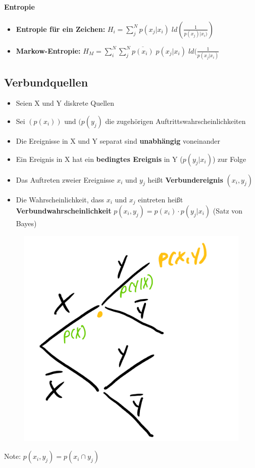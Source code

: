 \documentclass[12pt,a4paper]{article}
\begin{document}
\paragraph{Entropie\\}
\begin{itemize}
\item \textbf{Entropie für ein Zeichen:} $H_i = \sum_j^N p(x_j \vert x_i)\; ld(\frac{1}{p(x_j) \vert x_i)})$
\item \textbf{Markow-Entropie:} $H_M = \sum_i^N \sum_j^N \overline{p(x_i)}\; p(x_j\vert x_i)\; ld(\frac{1}{p(x_j\vert x_i)} $
\end{itemize}

\subsection{Verbundquellen}
\begin{itemize}
\item Seien X und Y diskrete Quellen
\item Sei $(p(x_i))$ und $(p(y_j)$ die zugehörigen Auftrittswahrscheinlichkeiten
\item Die Ereignisse in X und Y separat sind \textbf{unabhängig} voneinander
\item Ein Ereignis in X hat ein \textbf{bedingtes Ereignis} in Y ($p(y_j\vert x_i)$) zur Folge
\item Das Auftreten zweier Ereignisse $x_i$ und $y_j$ heißt \textbf{Verbundereignis} $(x_i, y_j)$
\item Die Wahrscheinlichkeit, dass $x_i$ und $x_j$ eintreten heißt\\
\textbf{Verbundwahrscheinlichkeit} $p(x_i,y_j) = p(x_i) \cdot p(y_j\vert x_i)$ (Satz von Bayes)
\end{itemize}
\begin{figure}[H]
\centering
\includegraphics[scale=0.3]{./resources/verb_baum.png}
\end{figure}
Note: $p(x_i, y_j) = p(x_i\cap y_j)$
\end{document}
